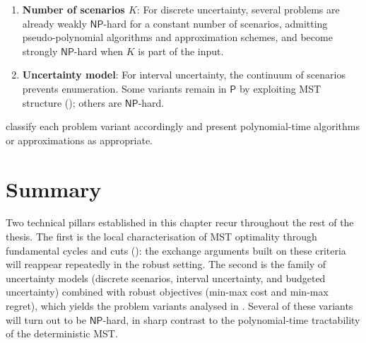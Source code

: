\begin{enumerate}[nosep]
\item \textbf{Number of scenarios $K$}: For discrete uncertainty, several problems are already weakly $\mathsf{NP}$-hard for a constant number of scenarios, admitting pseudo-polynomial algorithms and approximation schemes, and become strongly $\mathsf{NP}$-hard when $K$ is part of the input.
\item \textbf{Uncertainty model}: For interval uncertainty, the continuum of scenarios prevents enumeration. Some variants remain in $\mathsf{P}$ by exploiting MST structure (); others are $\mathsf{NP}$-hard.
\end{enumerate}

 classify each problem variant accordingly and present polynomial-time algorithms or approximations as appropriate.


% 
\section*{Summary}

Two technical pillars established in this chapter recur throughout the rest of the thesis.
The first is the local characterisation of MST optimality through fundamental cycles and cuts (): the exchange arguments built on these criteria will reappear repeatedly in the robust setting.
The second is the family of uncertainty models (discrete scenarios, interval uncertainty, and budgeted uncertainty) combined with robust objectives (min-max cost and min-max regret), which yields the problem variants analysed in .
Several of these variants will turn out to be $\mathsf{NP}$-hard, in sharp contrast to the polynomial-time tractability of the deterministic MST.


